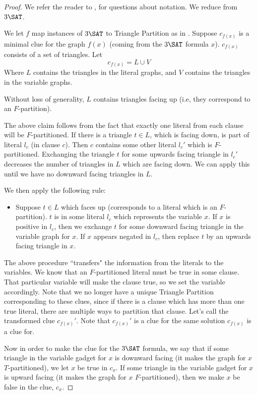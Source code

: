 \documentclass[runningheads,a4paper]{llncs}
\begin{document}
\begin{proof}
We refer the reader to \cite{holyer1981np}, \cite{colbourn1984complexity} for questions about notation. We reduce from $3\SAT$.

We let $f$ map instances of $3\SAT$ to Triangle Partition as in \cite{holyer1981np}. Suppose $c_{f(x)}$ is a minimal clue for the graph $f(x)$ (coming from the $3\SAT$ formula $x$). $c_{f(x)}$ consists of a set of triangles. Let 
\[ c_{f(x)} = L \cup V \]
Where $L$ contains the triangles in the literal graphs, and $V$ contains the triangles in the variable graphs. 

\begin{claim}
Without loss of generality, $L$ contains triangles facing up (i.e, they correspond to an $F$-partition).
\end{claim}

The above claim follows from the fact that exactly one literal from each clause will be $F$-partitioned. If there is a triangle $t \in L$, which is facing down, is part of literal $l_c$ (in clause $c$). Then $c$ contains some other literal $l_c'$ which is $F$-partitioned. Exchanging the triangle $t$ for some upwards facing triangle in $l_c'$ decreases the number of triangles in $L$ which are facing down. We can apply this until we have no downward facing triangles in $L$. 

We then apply the following rule:
\begin{itemize}
\item Suppose $t \in L$ which faces up (corresponds to a literal which is an $F$-partition). $t$ is in some literal $l_c$ which represents the variable $x$. If $x$ is positive in $l_c$, then we exchange $t$ for some downward facing triangle in the variable graph for $x$. If $x$ appears negated in $l_c$, then replace $t$ by an upwards facing triangle in $x$.  
\end{itemize}

The above procedure ``transfers" the information from the literals to the variables. We know that an $F$-partitioned literal must be true in some clause. That particular variable will make the clause true, so we set the variable accordingly. Note that we no longer have a unique Triangle Partition corresponding to these clues, since if there is a clause which has more than one true literal, there are multiple ways to partition that clause. Let's call the transformed clue $c_{f(x)}'$. Note that $c_{f(x)}'$ is a clue for the same solution $c_{f(x)}$ is a clue for.

Now in order to make the clue for the $3\SAT$ formula, we say that if some triangle in the variable gadget for $x$ is downward facing (it makes the graph for $x$ $T$-partitioned), we let $x$ be true in $c_x$. If some triangle in the variable gadget for $x$ is upward facing (it makes the graph for $x$ $F$-partitioned), then we make $x$ be false in the clue, $c_x$. 


\end{proof}
\end{document}
